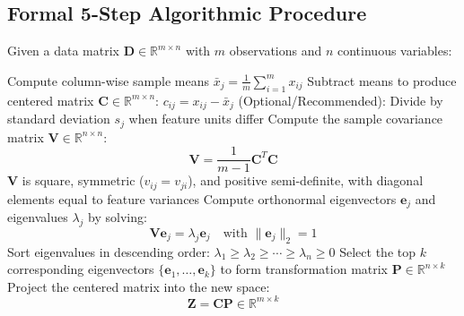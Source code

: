 \subsection{Formal 5-Step Algorithmic Procedure}
Given a data matrix $\mathbf{D} \in \mathbb{R}^{m \times n}$ with $m$ observations and $n$ continuous variables:

\begin{algorithm}[H]
\caption{Principal Component Analysis (PCA)}
\BlankLine
{}
Compute column-wise sample means $\bar{x}_j = \frac{1}{m}\sum_{i=1}^m x_{ij}$\;
Subtract means to produce centered matrix $\mathbf{C} \in \mathbb{R}^{m \times n}$: $c_{ij} = x_{ij} - \bar{x}_j$\;
(Optional/Recommended): Divide by standard deviation $s_j$ when feature units differ\;
\BlankLine
{}
Compute the sample covariance matrix $\mathbf{V} \in \mathbb{R}^{n \times n}$:
\begin{equation}
\mathbf{V} = \frac{1}{m-1}\mathbf{C}^T\mathbf{C}
\end{equation}
$\mathbf{V}$ is square, symmetric ($v_{ij} = v_{ji}$), and positive semi-definite, with diagonal elements equal to feature variances\;
\BlankLine
{}
Compute orthonormal eigenvectors $\mathbf{e}_j$ and eigenvalues $\lambda_j$ by solving:
\begin{equation}
\mathbf{V}\mathbf{e}_j = \lambda_j \mathbf{e}_j \quad \text{with } \|\mathbf{e}_j\|_2 = 1
\end{equation}
\BlankLine
{}
Sort eigenvalues in descending order: $\lambda_1 \ge \lambda_2 \ge \cdots \ge \lambda_n \ge 0$\;
Select the top $k$ corresponding eigenvectors $\{\mathbf{e}_1, \dots, \mathbf{e}_k\}$ to form transformation matrix $\mathbf{P} \in \mathbb{R}^{n \times k}$\;
\BlankLine
{}
Project the centered matrix into the new space:
\begin{equation}
\mathbf{Z} = \mathbf{C}\mathbf{P} \in \mathbb{R}^{m \times k}
\end{equation}
\end{algorithm}

